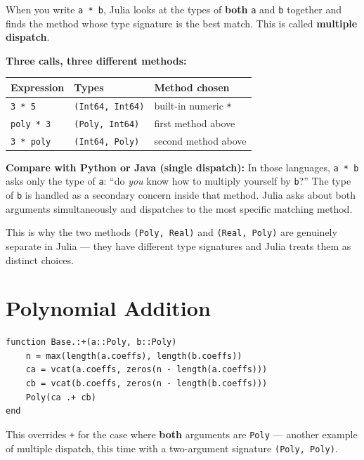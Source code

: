\documentclass[12pt, a4paper]{article}
\newcommand{\cd}[1]{\texttt{#1}}
\begin{document}
When you write \cd{a * b}, Julia looks at the types of
\textbf{both} \cd{a} and \cd{b} together and finds the method
whose type signature is the best match.
This is called \textbf{multiple dispatch}.

\begin{examplebox}
\textbf{Three calls, three different methods:}

\medskip
\begin{tabular}{lll}
\toprule
Expression & Types & Method chosen \\
\midrule
\cd{3 * 5}        & \cd{(Int64, Int64)}   & built-in numeric \cd{*} \\
\cd{poly * 3}     & \cd{(Poly, Int64)}    & first method above \\
\cd{3 * poly}     & \cd{(Int64, Poly)}    & second method above \\
\bottomrule
\end{tabular}
\end{examplebox}

\textbf{Compare with Python or Java (single dispatch):}
In those languages, \cd{a * b} asks only the type of \cd{a}:
``do \emph{you} know how to multiply yourself by \cd{b}?''
The type of \cd{b} is handled as a secondary concern inside that method.
Julia asks about both arguments simultaneously and dispatches
to the most specific matching method.

This is why the two methods \cd{(Poly, Real)} and \cd{(Real, Poly)}
are genuinely separate in Julia --- they have different type signatures
and Julia treats them as distinct choices.


\section{Polynomial Addition}

\begin{verbatim}
function Base.:+(a::Poly, b::Poly)
    n = max(length(a.coeffs), length(b.coeffs))
    ca = vcat(a.coeffs, zeros(n - length(a.coeffs)))
    cb = vcat(b.coeffs, zeros(n - length(b.coeffs)))
    Poly(ca .+ cb)
end
\end{verbatim}

This overrides \cd{+} for the case where \textbf{both} arguments
are \cd{Poly} --- another example of multiple dispatch, this time
with a two-argument signature \cd{(Poly, Poly)}.
\end{document}
